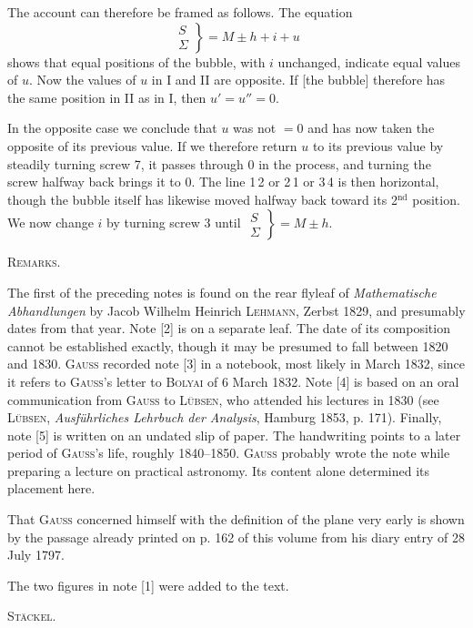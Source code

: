 The account can therefore be framed as follows. The equation
\[
\left.\begin{array}{c} S \\ \Sigma \end{array}\right\} = M\pm h+i+u
\]
shows that equal positions of the bubble, with $i$ unchanged, indicate equal values of $u$. Now the values of $u$ in I and II are opposite. If [the bubble] therefore has the same position in II as in I, then $u'=u''=0$.

In the opposite case we conclude that $u$ was not $=0$ and has now taken the opposite of its previous value. If we therefore return $u$ to its previous value by steadily turning screw 7, it passes through 0 in the process, and turning the screw halfway back brings it to 0. The line 1\,2 or 2\,1 or 3\,4 is then horizontal, though the bubble itself has likewise moved halfway back toward its 2$^{\mathrm{nd}}$ position. We now change $i$ by turning screw 3 until $\left.\substack{S\\\Sigma}\right\} = M\pm h$.

\begin{center}
\textsc{Remarks.}
\end{center}

The first of the preceding notes is found on the rear flyleaf of \emph{Mathematische Abhandlungen} by Jacob Wilhelm Heinrich \textsc{Lehmann}, Zerbst 1829, and presumably dates from that year. Note [2] is on a separate leaf. The date of its composition cannot be established exactly, though it may be presumed to fall between 1820 and 1830. \textsc{Gauss} recorded note [3] in a notebook, most likely in March 1832, since it refers to \textsc{Gauss}'s letter to \textsc{Bolyai} of 6 March 1832. Note [4] is based on an oral communication from \textsc{Gauss} to \textsc{Lübsen}, who attended his lectures in 1830 (see \textsc{Lübsen}, \emph{Ausf\"uhrliches Lehrbuch der Analysis}, Hamburg 1853, p. 171). Finally, note [5] is written on an undated slip of paper. The handwriting points to a later period of \textsc{Gauss}'s life, roughly 1840--1850. \textsc{Gauss} probably wrote the note while preparing a lecture on practical astronomy. Its content alone determined its placement here.

That \textsc{Gauss} concerned himself with the definition of the plane very early is shown by the passage already printed on p. 162 of this volume from his diary entry of 28 July 1797.

The two figures in note [1] were added to the text.

\hfill \textsc{Stäckel.}

